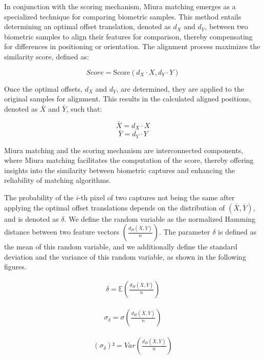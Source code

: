 In conjunction with the scoring mechanism, Miura matching emerges as a specialized technique for comparing biometric samples. This method entails determining an optimal offset translation, denoted as \(d_X\) and \(d_Y\), between two biometric samples to align their features for comparison, thereby compensating for differences in positioning or orientation. The alignment process maximizes the similarity score, defined as:

\[Score = \text{Score}(d_X \cdot X, d_Y \cdot Y)\]

Once the optimal offsets, \(d_X\) and \(d_Y\), are determined, they are applied to the original samples for alignment. This results in the calculated aligned positions, denoted as \(\bar{X}\) and \(\bar{Y}\), such that:

\[\bar{X} = d_X \cdot X\]
\[\bar{Y} = d_Y \cdot Y\]

Miura matching and the scoring mechanism are interconnected components, where Miura matching facilitates the computation of the score, thereby offering insights into the similarity between biometric captures and enhancing the reliability of matching algorithms.

The probability of the \(i\)-th pixel of two captures not being the same after applying the optimal offset translations depends on the distribution of \((\bar{X}, \bar{Y})\), and is denoted as \(\delta\). We define the random variable as the normalized Hamming distance between two feature vectors \(\left( \frac{d_H(\bar{X}, \bar{Y})}{n} \right)\). The parameter \(\delta\) is defined as the mean of this random variable, and we additionally define the standard deviation and the variance of this random variable, as shown in the following figures.



\begin{equation} \label{eq:delta}
    \begin{aligned}
        \delta = \mathbb{E}\left( \frac{d_H(\bar{X}, \bar{Y})}{n} \right)
    \end{aligned}
\end{equation}

\begin{equation}
    \begin{aligned}
        \sigma_{\delta} = {\sigma}\left( \frac{d_H(\bar{X}, \bar{Y})}{n} \right)
    \end{aligned}
\end{equation}

\begin{equation}
    \begin{aligned}
        (\sigma_{\delta})² = {Var}\left( \frac{d_H(\bar{X}, \bar{Y})}{n} \right)
    \end{aligned}
\end{equation}

